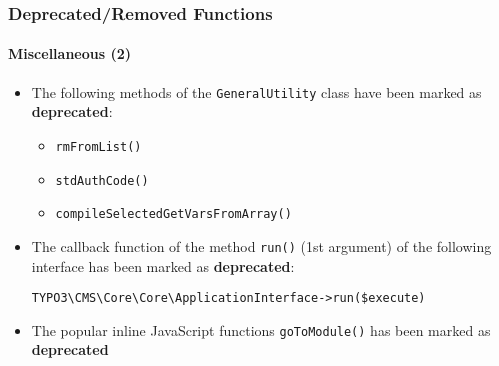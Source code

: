 %

\begin{frame}[fragile]
	\frametitle{Deprecated/Removed Functions}
	\framesubtitle{Miscellaneous (2)}


	\begin{itemize}
		\item The following methods of the \texttt{GeneralUtility} class
			have been marked as \textbf{deprecated}:
			\begin{itemize}
				\item \texttt{rmFromList()}
				\item \texttt{stdAuthCode()}
				\item \texttt{compileSelectedGetVarsFromArray()}
			\end{itemize}

		\item The callback function of the method \texttt{run()} (1st argument)
			of the following interface has been marked as \textbf{deprecated}:
\begin{lstlisting}
TYPO3\CMS\Core\Core\ApplicationInterface->run($execute)
\end{lstlisting}

		\item The popular inline JavaScript functions \texttt{goToModule()}
			has been marked as \textbf{deprecated}

	\end{itemize}

\end{frame}

